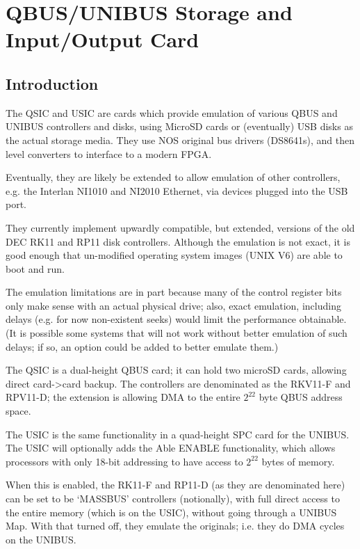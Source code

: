 %

\chapter[QBUS/UNIBUS Storage and I/O Card]{QBUS/UNIBUS Storage and Input/Output Card}
\section{Introduction}

The QSIC and USIC are cards which provide emulation of various QBUS and
UNIBUS controllers and disks, using MicroSD cards or (eventually) USB disks
as the actual storage media. They use NOS original bus drivers (DS8641s),
and then level converters to interface to a modern FPGA.

Eventually, they are likely be extended to allow emulation of other
controllers, e.g. the Interlan NI1010 and NI2010 Ethernet, via devices
plugged into the USB port.

They currently implement upwardly compatible, but extended, versions of the
old DEC RK11 and RP11 disk controllers. Although the emulation is not exact,
it is good enough that un-modified operating system images (UNIX V6) are able
to boot and run.

The emulation limitations are in part because many of the control register
bits only make sense with an actual physical drive; also, exact emulation,
including delays (e.g. for now non-existent seeks) would limit the
performance obtainable. (It is possible some systems that will not work
without better emulation of such delays; if so, an option could be added to
better emulate them.)

The QSIC is a dual-height QBUS card; it can hold two microSD cards,
allowing direct card-\textgreater card backup. The controllers are
denominated as the RKV11-F and RPV11-D; the extension is allowing DMA
to the entire $2^{22}$ byte QBUS address space.

The USIC is the same functionality in a quad-height SPC card for the UNIBUS.
The USIC will optionally adds the Able ENABLE functionality, which allows
processors with only 18-bit addressing to have access to $2^{22}$ bytes of
memory.

When this is enabled, the RK11-F and RP11-D (as they are denominated here)
can be set to be `MASSBUS' controllers (notionally), with full direct access
to the entire memory (which is on the USIC), without going through a UNIBUS
Map. With that turned off, they emulate the originals; i.e. they do DMA
cycles on the UNIBUS.

